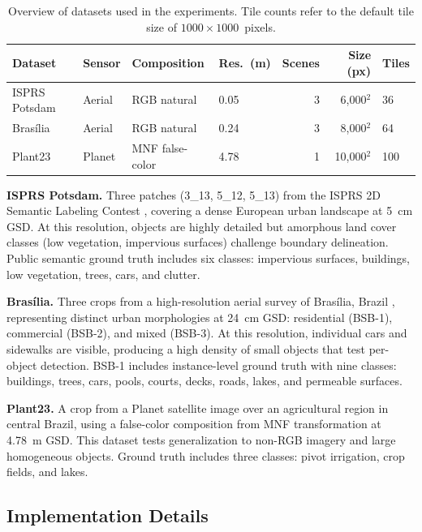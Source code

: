 \documentclass[review,11pt,authoryear]{elsarticle}
\begin{document}
\begin{table}[htbp]
\centering
\caption{Overview of datasets used in the experiments. Tile counts refer to the default tile size of $1000 \times 1000$~pixels.}
\label{tab:datasets}
\begin{tabular*}{\textwidth}{@{\extracolsep{\fill}}llllrrl}
\toprule
Dataset & Sensor & Composition & Res.\ (m) & Scenes & Size (px) & Tiles \\
\midrule
ISPRS Potsdam & Aerial & RGB natural & 0.05 & 3 & 6{,}000$^2$ & 36 \\
Bras\'{i}lia & Aerial & RGB natural & 0.24 & 3 & 8{,}000$^2$ & 64 \\
Plant23 & Planet & MNF false-color & 4.78 & 1 & 10{,}000$^2$ & 100 \\
\bottomrule
\end{tabular*}
\end{table}

\textbf{ISPRS Potsdam.} Three patches (3\_13, 5\_12, 5\_13) from the ISPRS 2D Semantic Labeling Contest \citep{rottensteiner2014isprs}, covering a dense European urban landscape at 5~cm GSD. At this resolution, objects are highly detailed but amorphous land cover classes (low vegetation, impervious surfaces) challenge boundary delineation. Public semantic ground truth includes six classes: impervious surfaces, buildings, low vegetation, trees, cars, and clutter.

\textbf{Bras\'{i}lia.} Three crops from a high-resolution aerial survey of Bras\'{i}lia, Brazil \citep{carvalho2022panoptic}, representing distinct urban morphologies at 24~cm GSD: residential (BSB-1), commercial (BSB-2), and mixed (BSB-3). At this resolution, individual cars and sidewalks are visible, producing a high density of small objects that test per-object detection. BSB-1 includes instance-level ground truth with nine classes: buildings, trees, cars, pools, courts, decks, roads, lakes, and permeable surfaces.

\textbf{Plant23.} A crop from a Planet satellite image \citep{frazier2021planet} over an agricultural region in central Brazil, using a false-color composition from MNF transformation \citep{green1988mnf} at 4.78~m GSD. This dataset tests generalization to non-RGB imagery and large homogeneous objects. Ground truth includes three classes: pivot irrigation, crop fields, and lakes.

\subsection{Implementation Details}
\label{sec:exp_impl}
\end{document}
